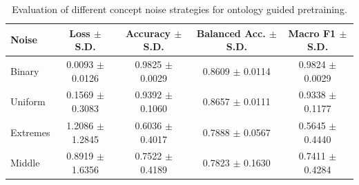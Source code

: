 \begin{table}[t]
\centering
\begin{tabular}{l c c c c}
\toprule
Noise & Loss $\pm$ S.D. & Accuracy $\pm$ S.D. & Balanced Acc. $\pm$ S.D. & Macro F1 $\pm$ S.D. \\
\midrule
Binary & 0.0093 $\pm$ 0.0126 & 0.9825 $\pm$ 0.0029 & 0.8609 $\pm$ 0.0114 & 0.9824 $\pm$ 0.0029 \\
Uniform& 0.1569 $\pm$ 0.3083 & 0.9392 $\pm$ 0.1060 & 0.8657 $\pm$ 0.0111 & 0.9338 $\pm$ 0.1177 \\
Extremes & 1.2086 $\pm$ 1.2845 & 0.6036 $\pm$ 0.4017 & 0.7888 $\pm$ 0.0567 & 0.5645 $\pm$ 0.4440 \\
Middle & 0.8919 $\pm$ 1.6356 & 0.7522 $\pm$ 0.4189 & 0.7823 $\pm$ 0.1630 & 0.7411 $\pm$ 0.4284 \\
\bottomrule
\end{tabular}
\caption{Evaluation of different concept noise strategies for ontology guided pretraining.}
\label{tab:noise_selection}
\end{table}